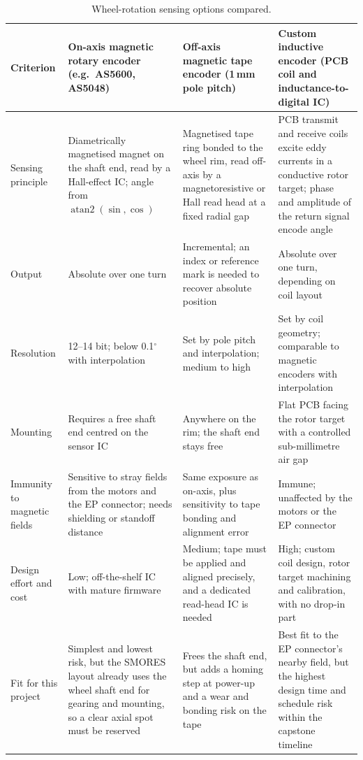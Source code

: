\documentclass[12pt,a4paper]{article}
\begin{document}
\begin{table}[H]
\centering\small
\caption{Wheel-rotation sensing options compared.}
\label{tab:encoders}
\begin{tabular}{@{}L{0.14\textwidth} L{0.26\textwidth} L{0.26\textwidth}
                    L{0.26\textwidth}@{}}
\toprule
\textbf{Criterion} &
\textbf{On-axis magnetic rotary encoder (e.g.\ AS5600, AS5048)} &
\textbf{Off-axis magnetic tape encoder (1\,mm pole pitch)} &
\textbf{Custom inductive encoder (PCB coil and inductance-to-digital IC)} \\
\midrule
Sensing principle &
  Diametrically magnetised magnet on the shaft end, read by a Hall-effect IC;
  angle from $\operatorname{atan2}(\sin,\cos)$ &
  Magnetised tape ring bonded to the wheel rim, read off-axis by a
  magnetoresistive or Hall read head at a fixed radial gap &
  PCB transmit and receive coils excite eddy currents in a conductive rotor
  target; phase and amplitude of the return signal encode angle \\
Output &
  Absolute over one turn &
  Incremental; an index or reference mark is needed to recover absolute
  position &
  Absolute over one turn, depending on coil layout \\
Resolution &
  12--14 bit; below 0.1$^\circ$ with interpolation &
  Set by pole pitch and interpolation; medium to high &
  Set by coil geometry; comparable to magnetic encoders with interpolation \\
Mounting &
  Requires a free shaft end centred on the sensor IC &
  Anywhere on the rim; the shaft end stays free &
  Flat PCB facing the rotor target with a controlled sub-millimetre air gap \\
Immunity to magnetic fields &
  Sensitive to stray fields from the motors and the EP connector; needs
  shielding or standoff distance &
  Same exposure as on-axis, plus sensitivity to tape bonding and alignment
  error &
  Immune; unaffected by the motors or the EP connector \\
Design effort and cost &
  Low; off-the-shelf IC with mature firmware &
  Medium; tape must be applied and aligned precisely, and a dedicated
  read-head IC is needed &
  High; custom coil design, rotor target machining and calibration, with no
  drop-in part \\
Fit for this project &
  Simplest and lowest risk, but the SMORES layout already uses the wheel shaft
  end for gearing and mounting, so a clear axial spot must be reserved &
  Frees the shaft end, but adds a homing step at power-up and a wear and
  bonding risk on the tape &
  Best fit to the EP connector's nearby field, but the highest design time and
  schedule risk within the capstone timeline \\
\bottomrule
\end{tabular}
\end{table}
\end{document}
